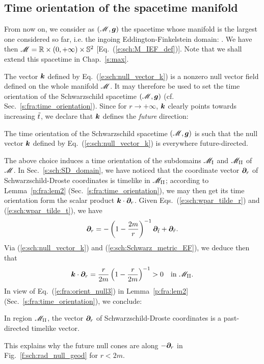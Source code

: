 \subsection{Time orientation of the spacetime manifold} \label{s:sch:time_orientation}

From now on, we consider as
 $(\mathscr{M},\bm{g})$ the spacetime
whose manifold is the largest one considered so far, i.e. the ingoing Eddington-Finkelstein
domain:
\be \label{s:sch:def_Schwarz_spacetime}
   .
\ee
We have then $\mathscr{M} = \mathbb{R}\times(0,+\infty)\times\mathbb{S}^2$ [Eq.~(\ref{e:sch:M_IEF_def})].
Note that we shall extend this spacetime in Chap.~\ref{s:max}.

The vector $\bm{k}$ defined by Eq.~(\ref{e:sch:null_vector_k}) is a nonzero null vector field
defined on the whole manifold
$\mathscr{M}$. It may therefore be used to set the time orientation of the Schwarzschild spacetime $(\mathscr{M},\bm{g})$
(cf. Sec.~\ref{s:fra:time_orientation}). Since for $r\rightarrow+\infty$, $\bm{k}$
clearly points towards increasing ${\tilde t}$, we declare that $\bm{k}$ defines
the \emph{future} direction:
\begin{prop}
The time orientation of the Schwarzschild spacetime $(\mathscr{M}, \bm{g})$ is such
that the null vector $\bm{k}$ defined by Eq.~(\ref{e:sch:null_vector_k})
is everywhere future-directed.
\end{prop}

The above choice induces a time orientation of the subdomains
$\mathscr{M}_{\rm I}$ and $\mathscr{M}_{\rm II}$ of $\mathscr{M}$.
In Sec.~\ref{s:sch:SD_domain},
we have noticed that the coordinate vector
$\bm{\partial}_r$ of Schwarzschild-Droste coordinates is timelike in $\mathscr{M}_{\rm II}$;
according to Lemma~\ref{p:fra:lem2} (Sec.~\ref{s:fra:time_orientation}),
we may then get its time
orientation form the scalar product $\bm{k}\cdot\bm{\partial}_r$. Given
Eqs.~(\ref{e:sch:wpar_tilde_r}) and (\ref{e:sch:wpar_tilde_t}), we have
\[
    \bm{\partial}_r = - \left( 1 - \frac{2m}{r} \right) ^{-1} \bm{\partial}_{{\tilde t}}
        + \bm{\partial}_{\tilde r} .
\]
Via (\ref{e:sch:null_vector_k}) and (\ref{e:sch:Schwarz_metric_EF}), we deduce
then that
\[
    \bm{k}\cdot\bm{\partial}_r = \frac{r}{2m} \left( 1 - \frac{r}{2m} \right) ^{-1}
    > 0 \quad\mbox{in} \ \mathscr{M}_{\rm II} .
\]
In view of Eq.~(\ref{e:fra:orient_null3}) in Lemma~\ref{p:fra:lem2} (Sec.~\ref{s:fra:time_orientation}), we conclude:
\begin{prop}
In region $\mathscr{M}_{\rm II}$, the vector $\bm{\partial}_r$ of Schwarzschild-Droste coordinates
is a past-directed timelike vector.
\end{prop}
This explains why the future null cones are along $-\bm{\partial}_r$
in Fig.~\ref{f:sch:rad_null_geod} for $r<2m$.

